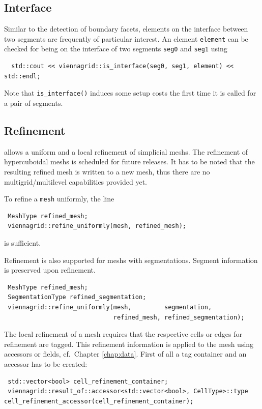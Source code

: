  \subsection{Interface}
  Similar to the detection of boundary facets, elements on the interface between two segments are frequently of particular interest.
  An element \lstinline|element| can be checked for being on the interface of two segments \lstinline|seg0| and \lstinline|seg1| using
 \begin{lstlisting}
  std::cout << viennagrid::is_interface(seg0, seg1, element) << std::endl;
 \end{lstlisting}
 Note that \lstinline|is_interface()| induces some setup costs the first time it is called for a pair of segments.



 \subsection{Refinement}
 {\ViennaGridversion} allows a uniform and a local refinement of simplicial meshs. The refinement of hypercuboidal meshs is scheduled for future releases.
It has to be noted that the resulting refined mesh is written to a new mesh, thus there are no multigrid/multilevel capabilities provided yet.

 To refine a \lstinline|mesh| uniformly, the line
 \begin{lstlisting}
 MeshType refined_mesh;
 viennagrid::refine_uniformly(mesh, refined_mesh);
 \end{lstlisting}
 is sufficient.

 Refinement is also supported for meshs with segmentations. Segment information is preserved upon refinement.
 \begin{lstlisting}
 MeshType refined_mesh;
 SegmentationType refined_segmentation;
 viennagrid::refine_uniformly(mesh,         segmentation,
                              refined_mesh, refined_segmentation);
 \end{lstlisting}

 The local refinement of a mesh requires that the respective cells or edges for refinement are tagged. This refinement information is applied to the mesh using accessors or fields, cf.~Chapter \ref{chap:data}.
 First of all a tag container and an accessor has to be created:
 \begin{lstlisting}
 std::vector<bool> cell_refinement_container;
 viennagrid::result_of::accessor<std::vector<bool>, CellType>::type cell_refinement_accessor(cell_refinement_container);
 \end{lstlisting}


